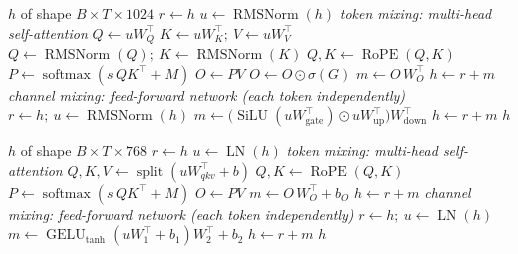 \documentclass[10pt,a4paper]{article}
\newcommand{\op}[1]{\operatorname{#1}}
\theoremstyle{definition}
\begin{document}
\begin{algorithm}[H]
\caption{Block $\mathcal{B}_{\mathrm{F}}(h)$ --- Full (global) attention block}
\begin{algorithmic}[1]
\Require $h$ of shape $B\times T\times 1024$
\State $r \gets h$ 
\State $u \gets \op{RMSNorm}(h)$ 
\Statex \hspace{-1.2em}\textit{token mixing: multi-head self-attention}
\State $Q \gets u W_Q^{\top}$ 
\State $K \gets u W_K^{\top};\ V \gets u W_V^{\top}$ 
\State $Q \gets \op{RMSNorm}(Q);\ K \gets \op{RMSNorm}(K)$ 
\State $Q, K \gets \op{RoPE}(Q, K)$ 
\State $P \gets \op{softmax}(s\, Q K^{\top} + M)$ 
\State $O \gets P V$ 
\State $O \gets O \odot \sigma(G)$ 
\State $m \gets O\, W_O^{\top}$ 
\State $h \gets r + m$ 
\Statex \hspace{-1.2em}\textit{channel mixing: feed-forward network (each token independently)}
\State $r \gets h;\ u \gets \op{RMSNorm}(h)$
\State $m \gets \big(\op{SiLU}(u W_{\mathrm{gate}}^{\top}) \odot u W_{\mathrm{up}}^{\top}\big) W_{\mathrm{down}}^{\top}$ 
\State $h \gets r + m$ 
\State \Return $h$
\end{algorithmic}
\end{algorithm}
\begin{algorithm}[H]
\caption{Block $\mathcal{B}_{\mathrm{V}}(h)$ --- Vision encoder block}
\begin{algorithmic}[1]
\Require $h$ of shape $B\times T\times 768$
\State $r \gets h$ 
\State $u \gets \op{LN}(h)$ 
\Statex \hspace{-1.2em}\textit{token mixing: multi-head self-attention}
\State $Q,K,V \gets \op{split}(u W_{qkv}^{\top} + b)$ 
\State $Q, K \gets \op{RoPE}(Q, K)$ 
\State $P \gets \op{softmax}(s\, Q K^{\top} + M)$ 
\State $O \gets P V$ 
\State $m \gets O\, W_O^{\top} + b_O$ 
\State $h \gets r + m$ 
\Statex \hspace{-1.2em}\textit{channel mixing: feed-forward network (each token independently)}
\State $r \gets h;\ u \gets \op{LN}(h)$
\State $m \gets \op{GELU}_{\tanh}(u W_1^{\top} + b_1) W_2^{\top} + b_2$ 
\State $h \gets r + m$ 
\State \Return $h$
\end{algorithmic}
\end{algorithm}
\end{document}
